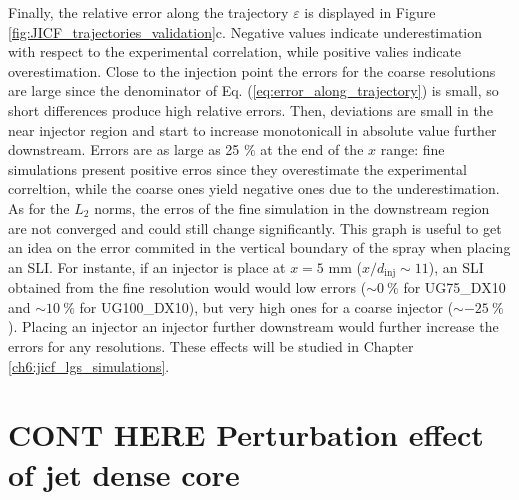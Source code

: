 Finally, the relative error along the trajectory $\varepsilon$ is displayed in Figure \ref{fig:JICF_trajectories_validation}c. Negative values indicate underestimation with respect to the experimental correlation, while positive valies indicate overestimation. Close to the injection point the errors for the coarse resolutions are large since the denominator of Eq. (\ref{eq:error_along_trajectory}) is small, so short differences produce high relative errors. Then, deviations are small in the near injector region and start to increase monotonicall in absolute value further downstream. Errors are as large as 25 $\%$ at the end of the $x$ range: fine simulations present positive erros since they overestimate the experimental correltion, while the coarse ones yield negative ones due to the underestimation. As for the $L_2$ norms, the erros of the fine simulation in the downstream region are not converged and could still change significantly. This graph is useful to get an idea on the error commited in the vertical boundary of the spray when placing an SLI. For instante, if an injector is place at $x = 5$ mm ($x/d_\mathrm{inj} \sim 11$), an SLI obtained from the fine resolution would would low errors ($\sim 0~\%$ for UG75\_DX10 and $\sim 10~\%$ for UG100\_DX10), but very high ones for a coarse injector ($\sim - 25~\%$). Placing an injector an injector further downstream would further increase the errors for  any resolutions. These effects will be studied in Chapter \ref{ch6:jicf_lgs_simulations}.

%

\clearpage

\section{CONT HERE Perturbation effect of jet dense core}
\label{subsec:ch5_dense_core_in_ACLS_simus}

